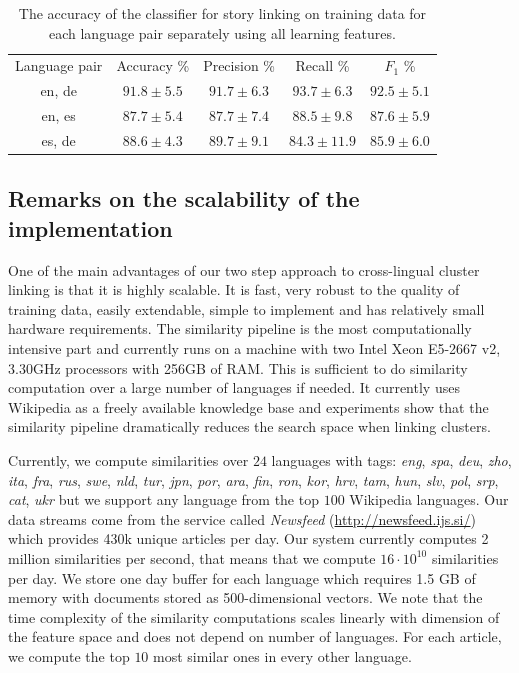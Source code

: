 \begin{table}[t]
\label{table:langPairEval}
\begin{center}
\begin{tabular}{|c|c|c|c|c|}
  \hline
  \cline{1-5}
  Language pair & Accuracy \% & Precision \% & Recall \% & $F_1$ \% \\ \cline{1-5}
  en, de & $91.8 \pm 5.5$ & $91.7 \pm  6.3$ & $93.7 \pm  6.3$ & $92.5 \pm  5.1$ \\ \cline{1-5}
  en, es & $87.7 \pm 5.4$ & $87.7 \pm  7.4$ & $88.5 \pm  9.8$ & $87.6 \pm  5.9$ \\ \cline{1-5}
  es, de & $88.6 \pm 4.3$ & $89.7 \pm  9.1$ & $84.3 \pm 11.9$ & $85.9 \pm  6.0$ \\ \cline{1-5}
  \hline
\end{tabular}
\end{center}
\caption{The accuracy of the classifier for story linking on training data for each language pair separately using all learning features.}
\end{table}

\subsection{Remarks on the scalability of the implementation}

One of the main advantages of our two step approach to cross-lingual cluster linking is that it is highly scalable. 
It is fast, very robust to the quality of training data, easily extendable, simple to implement 
and has relatively small hardware requirements. The similarity pipeline is the most computationally 
intensive part and currently runs on a machine with two Intel Xeon E5-2667 v2, 3.30GHz processors 
with 256GB of RAM. This is sufficient to do similarity computation over a large number of 
languages if needed. It currently uses Wikipedia as a freely available knowledge base 
and experiments show that the similarity pipeline dramatically reduces the search space when linking clusters.

Currently, we compute similarities over $24$ languages with 
tags: \emph{eng}, \emph{spa}, \emph{deu}, \emph{zho}, \emph{ita}, \emph{fra}, \emph{rus}, 
\emph{swe}, \emph{nld}, \emph{tur}, \emph{jpn}, \emph{por}, \emph{ara}, \emph{fin}, 
\emph{ron}, \emph{kor}, \emph{hrv}, \emph{tam}, \emph{hun}, \emph{slv}, \emph{pol}, 
\emph{srp}, \emph{cat}, \emph{ukr} but we support any language from the top $100$ Wikipedia languages. 
Our data streams come from the service called \emph{Newsfeed} (\url{http://newsfeed.ijs.si/}) 
which provides 430k unique articles per day. 
Our system currently computes 2 million similarities per second, that means that we 
compute $16 \cdot 10^{10}$ similarities per day. We
store one day buffer for each language which requires 1.5 GB of memory with documents 
stored as 500-dimensional vectors. We note that the time complexity of the similarity 
computations scales linearly with dimension of the feature space and does not 
depend on number of languages. For each article, we compute the top $10$ most 
similar ones in every other language.

